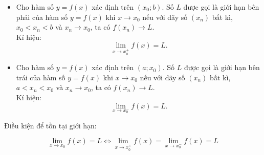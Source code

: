 \begin{itemize}
\begin{itemize}
	\item Cho hàm số $y=f(x)$ xác định trên $\left({x_0;b}\right) $. Số $L$ được gọi là giới hạn bên phải của hàm số $y=f(x)$ khi $x\to x_0$ nếu với dãy số $\left({x_n}\right)$ bất kì, $x_0<x_n<b$ và $x_n\to x_0$, ta có $f\left({x_n}\right)\to L $.\\
	Kí hiệu: $$\lim\limits_{x\to x_0^+}f(x)=L. $$
	\item Cho hàm số $y=f(x)$ xác định trên $\left({a;x_0}\right) $.
	Số $L$ được gọi là giới hạn bên trái của hàm số $y=f(x)$ khi $x\to x_0$ nếu với dãy số $\left({x_n}\right)$ bất kì, $a<x_n<x_0$ và $x_n\to x_0$, ta có $f\left({x_n}\right)\to L $. \\
	Kí hiệu: $$\lim\limits_{x\to x_0^-}f(x)=L. $$
\end{itemize}
\begin{note}
	Điều kiện để tồn tại giới hạn:
	\begin{khung}
		\[\lim\limits_{x\to x_0}f\left(x\right)=L\Leftrightarrow \lim\limits_{x\to x_0^+}f\left(x\right)=\lim\limits_{x\to x_0^-}f\left(x\right)=L\]
	\end{khung}
	
\end{note}
\end{itemize}
